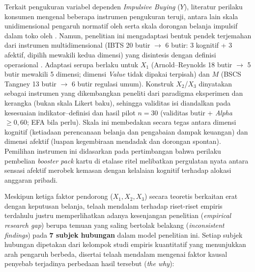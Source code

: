 \documentclass[12pt,a4paper]{article}
\numberwithin{equation}{section}
\numberwithin{table}{section}
\numberwithin{figure}{section}
\begin{document}
Terkait pengukuran variabel dependen \emph{Impulsive Buying} ($Y$), literatur perilaku konsumen mengenal beberapa instrumen pengukuran teruji, antara lain skala unidimensional pengaruh normatif oleh \citet{rook1995normative} serta skala dorongan belanja impulsif dalam toko oleh \citet{beatty1998impulse}. Namun, penelitian ini mengadaptasi bentuk pendek terjemahan dari instrumen multidimensional \citet{verplanken2001individual} (IBTS 20 butir $\rightarrow$ 6 butir: 3 kognitif + 3 afektif, dipilih mewakili kedua dimensi) yang disintesis dengan definisi operasional \citet{rook1987buying}. Adaptasi serupa berlaku untuk $X_1$ (Arnold--Reynolds 18 butir $\rightarrow$ 5 butir mewakili 5 dimensi; dimensi \emph{Value} tidak dipakai terpisah) dan $M$ (BSCS Tangney 13 butir $\rightarrow$ 6 butir regulasi umum). Konstruk $X_2$/$X_3$ dinyatakan sebagai instrumen yang dikembangkan peneliti dari paradigma eksperimen \citet{gao2014completing, barasz2017pseudo} dan kerangka \citet{shiller2000irrational} (bukan skala Likert baku), sehingga validitas isi diandalkan pada kesesuaian indikator--definisi dan hasil pilot $n=30$ (validitas butir + \emph{Alpha} $\ge 0{,}60$; EFA bila perlu). Skala ini membedakan secara tegas antara dimensi kognitif (ketiadaan perencanaan belanja dan pengabaian dampak keuangan) dan dimensi afektif (luapan kegembiraan mendadak dan dorongan spontan). Pemilihan instrumen ini didasarkan pada pertimbangan bahwa perilaku pembelian \emph{booster pack} kartu di etalase ritel melibatkan pergulatan nyata antara sensasi afektif merobek kemasan dengan kelalaian kognitif terhadap alokasi anggaran pribadi.

Meskipun ketiga faktor pendorong ($X_1, X_2, X_3$) secara teoretis berkaitan erat dengan keputusan belanja, telaah mendalam terhadap riset-riset empiris terdahulu justru memperlihatkan adanya kesenjangan penelitian (\emph{empirical research gap}) berupa temuan yang saling bertolak belakang (\emph{inconsistent findings}) pada \textbf{7 subjek hubungan} dalam model penelitian ini. Setiap subjek hubungan dipetakan dari kelompok studi empiris kuantitatif yang menunjukkan arah pengaruh berbeda, disertai telaah mendalam mengenai faktor kausal penyebab terjadinya perbedaan hasil tersebut (\emph{the why}):
\end{document}
